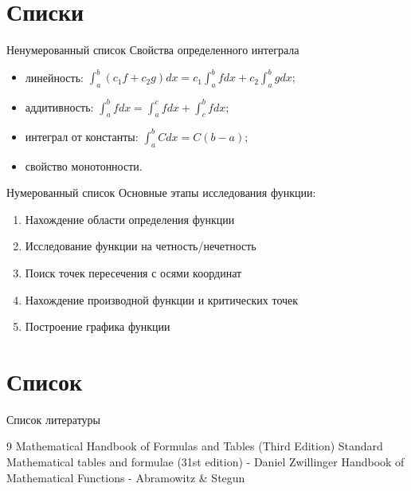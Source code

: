 \documentclass{beamer}
\begin{document}
\section{Списки}
\begin{frame}{Ненумерованный список}
Свойства определенного интеграла
\begin{itemize}
\item линейность:
$\int_a^b (c_1 f+c_2 g) dx=c_1 \int_a^b f dx+c_2 \int_a^b g dx;$
\item аддитивность:
$\int_a^b f dx=\int_a^c f dx+\int_c^b f dx;$
\item интеграл от константы:
$\int_a^b C dx=C(b-a);$
\item свойство монотонности.
\end{itemize}
\end{frame}

\begin{frame}{Нумерованный список}
Основные этапы исследования функции:
\begin{enumerate}
\item Нахождение области определения функции 
\item Исследование функции на четность/нечетность	
\item Поиск точек пересечения с осями координат
\item Нахождение производной функции и критических точек
\item Построение графика функции
\end{enumerate}
\end{frame}

\section{Список}
\begin{frame}{Список литературы}
\begin{thebibliography}{9}
 Mathematical Handbook of Formulas and Tables (Third Edition) 
 Standard Mathematical tables and formulae (31st edition) - Daniel Zwillinger
 Handbook of Mathematical Functions - Abramowitz \& Stegun
\end{thebibliography}
\end{frame}
\end{document}
